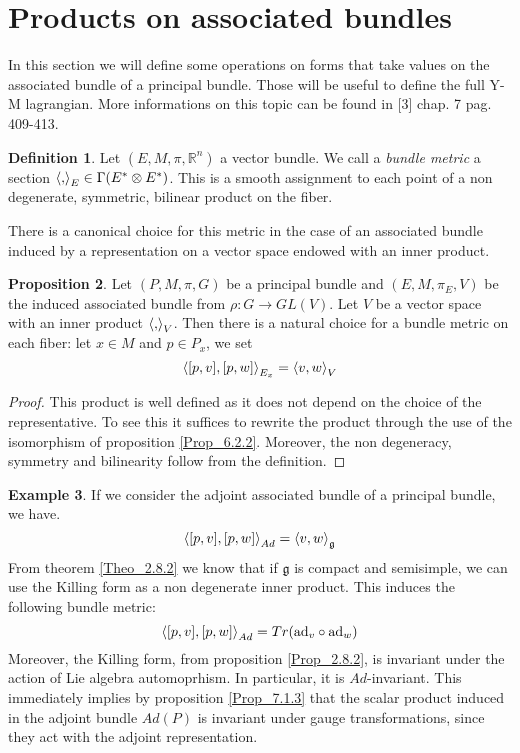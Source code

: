 \documentclass[12pt,a4paper]{report}
\theoremstyle{definition}
\newtheorem{Def}{Definition}[chapter]
\theoremstyle{Theorem}
\newtheorem{Prop}[Def]{Proposition}
\theoremstyle{definition}
\newtheorem{Ex}[Def]{Example}
\theoremstyle{definition}
\begin{document}
	\section{Products on associated bundles}
	In this section we will define some operations on forms that take values on the associated bundle of a principal bundle. Those will be useful to define the full Y-M lagrangian. More informations on this topic can be found in [3] chap. 7 pag. 409-413.
	\begin{Def}
		Let $(E,M,\pi,\mathbb{R}^n)$ a vector bundle. We call a \textit{bundle metric} a section $\braket{,}_E\in \Gamma(E^*\otimes E^*)$. This is a smooth assignment to each point of a non degenerate, symmetric, bilinear product on the fiber.
	\end{Def}
	There is a canonical choice for this metric in the case of an associated bundle induced by a representation on a vector space endowed with an inner product.
	\begin{Prop}
		Let $(P,M,\pi,G)$ be a principal bundle and $(E,M,\pi_E,V)$ be the induced associated bundle from $\rho:G\rightarrow GL(V)$. Let $V$ be a vector space with an inner product $\braket{,}_V$. Then there is a natural choice for a bundle metric on each fiber: let $x\in M$ and $p\in P_x$, we set 
		$$\braket{[p,v],[p,w]}_{E_x}=\braket{v,w}_V$$
	\end{Prop}
	\begin{proof}
		This product is well defined as it does not depend on the choice of the representative. To see this it suffices to rewrite the product through the use of the isomorphism of proposition \ref{Prop_6.2.2}. Moreover, the non degeneracy, symmetry and bilinearity follow from the definition.
	\end{proof}
	\begin{Ex}
		If we consider the adjoint associated bundle of a principal bundle, we have.
		$$\braket{[p,v],[p,w]}_{Ad}=\braket{v,w}_\mathfrak{g}$$
		From theorem \ref{Theo_2.8.2} we know that if $\mathfrak{g}$ is compact and semisimple, we can use the Killing form as a non degenerate inner product. This induces the following bundle metric:
		$$\braket{[p,v],[p,w]}_{Ad}=Tr(\hbox{ad}_v\circ\hbox{ad}_w)$$
		Moreover, the Killing form, from proposition \ref{Prop_2.8.2}, is invariant under the action of Lie algebra automoprhism. In particular, it is $Ad$-invariant. This immediately implies by proposition \ref{Prop_7.1.3} that the scalar product induced in the adjoint bundle $Ad(P)$ is invariant under gauge transformations, since they act with the adjoint representation.
	\end{Ex}
\end{document}
